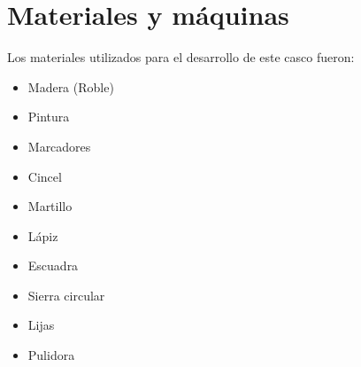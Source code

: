 \documentclass[letterpaper]{article}
\begin{document}
\section{Materiales y máquinas}
Los materiales utilizados para el desarrollo de este casco fueron:
\begin{itemize}
	\item Madera (Roble)
	\item Pintura
	\item Marcadores
	\item Cincel
	\item Martillo
	\item Lápiz
	\item Escuadra
	\item Sierra circular
	\item Lijas
	\item Pulidora
\end{itemize}

\newpage
\end{document}
